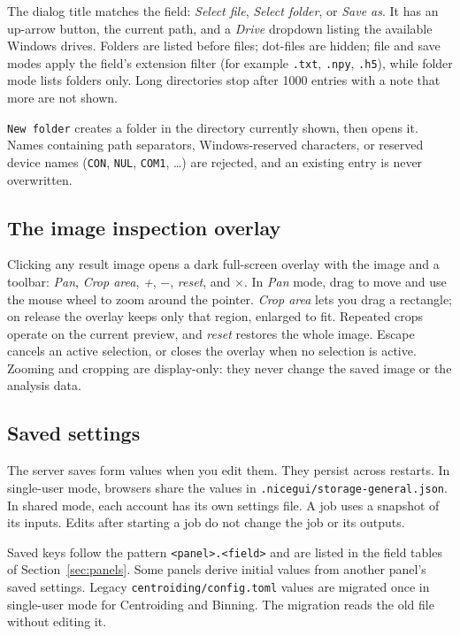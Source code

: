 \documentclass[11pt,a4paper]{article}
\newcommand{\code}[1]{\texttt{#1}}
\begin{document}
The dialog title matches the field: \emph{Select file}, \emph{Select
folder}, or \emph{Save as}. It has an up-arrow button, the current path, and
a \emph{Drive} dropdown listing the available Windows drives. Folders are
listed before files; dot-files are hidden; file and save modes apply the
field's extension filter (for example \code{.\allowbreak{}txt}, \code{.\allowbreak{}npy},
\code{.h5}), while folder mode lists folders only. Long directories stop
after 1000 entries with a note that more are not shown.

\code{New folder} creates a folder in the directory currently shown, then
opens it. Names containing path separators, Windows-reserved characters, or
reserved device names (\code{CON}, \code{NUL}, \code{COM1}, \ldots)
are rejected, and an existing entry is never overwritten.

\subsection{The image inspection overlay}
\label{sec:zoom}

Clicking any result image opens a dark full-screen overlay with the image and
a toolbar: \emph{Pan}, \emph{Crop area}, \emph{+}, \emph{$-$}, \emph{reset},
and \emph{$\times$}. In \emph{Pan} mode, drag to move and use the mouse
wheel to zoom around the pointer. \emph{Crop area} lets you drag a rectangle;
on release the overlay keeps only that region, enlarged to fit. Repeated
crops operate on the current preview, and \emph{reset} restores the whole
image. Escape cancels an active selection, or closes the overlay when no
selection is active. Zooming and cropping are display-only: they never
change the saved image or the analysis data.

\subsection{Saved settings}
\label{sec:settings}

The server saves form values when you edit them. They persist across
restarts. In single-user mode, browsers share the values in
\code{.nicegui/\allowbreak{}storage-\allowbreak{}general.json}. In shared
mode, each account has its own settings file. A job uses a snapshot of its
inputs. Edits after starting a job do not change the job or its outputs.

Saved keys follow the pattern \code{<panel>.\allowbreak{}<field>} and are listed in the
field tables of Section~\ref{sec:panels}. Some panels derive initial values
from another panel's saved settings. Legacy \code{centroiding/\allowbreak{}config.\allowbreak{}toml}
values are migrated once in single-user mode for Centroiding and Binning.
The migration reads the old file without editing it.
\end{document}
